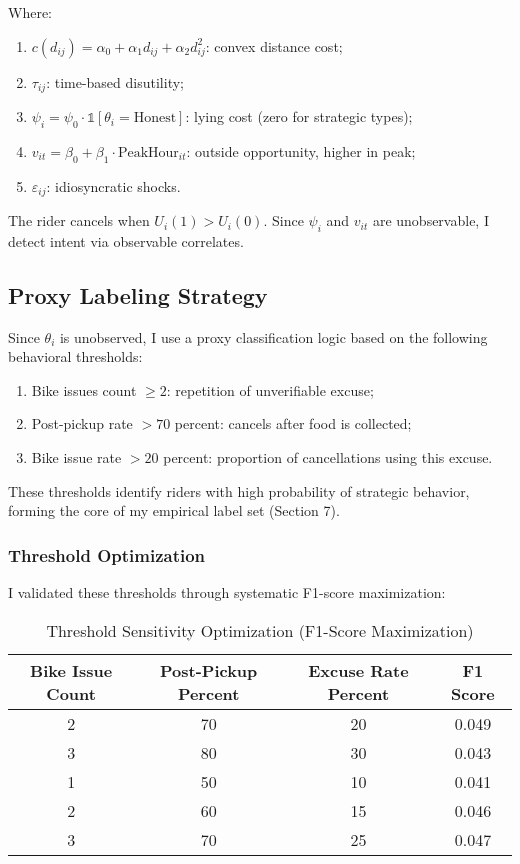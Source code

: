 Where:
\begin{enumerate}
    \item $c(d_{ij}) = \alpha_0 + \alpha_1 d_{ij} + \alpha_2 d_{ij}^2$: convex distance cost;
    \item $\tau_{ij}$: time-based disutility;
    \item $\psi_i = \psi_0 \cdot \mathbb{1}[\theta_i = \text{Honest}]$: lying cost (zero for strategic types);
    \item $v_{it} = \beta_0 + \beta_1 \cdot \text{PeakHour}_{it}$: outside opportunity, higher in peak;
    \item $\varepsilon_{ij}$: idiosyncratic shocks.
\end{enumerate}

The rider cancels when $U_i(1) > U_i(0)$. Since $\psi_i$ and $v_{it}$ are unobservable, I detect intent via observable correlates.

\subsection{Proxy Labeling Strategy}

Since $\theta_i$ is unobserved, I use a proxy classification logic based on the following behavioral thresholds:
\begin{enumerate}
    \item Bike issues count $\geq 2$: repetition of unverifiable excuse;
    \item Post-pickup rate $> 70$ percent: cancels after food is collected;
    \item Bike issue rate $> 20$ percent: proportion of cancellations using this excuse.
\end{enumerate}

These thresholds identify riders with high probability of strategic behavior, forming the core of my empirical label set (Section 7).

\subsubsection{Threshold Optimization}

I validated these thresholds through systematic F1-score maximization:

\begin{table}[H]
\centering
\caption{Threshold Sensitivity Optimization (F1-Score Maximization)}
\label{tab:threshold_opt}
\begin{tabular}{cccc}
\toprule
Bike Issue Count & Post-Pickup Percent & Excuse Rate Percent & F1 Score \\
\midrule
2 & 70 & 20 & 0.049 \\
3 & 80 & 30 & 0.043 \\
1 & 50 & 10 & 0.041 \\
2 & 60 & 15 & 0.046 \\
3 & 70 & 25 & 0.047 \\
\bottomrule
\end{tabular}
\end{table}

